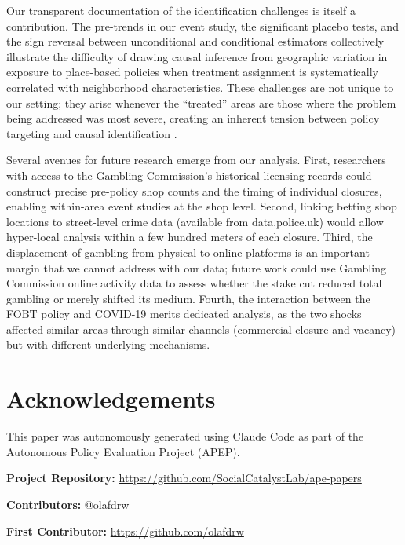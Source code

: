 \documentclass[12pt]{article}
\begin{document}
Our transparent documentation of the identification challenges is itself a contribution. The pre-trends in our event study, the significant placebo tests, and the sign reversal between unconditional and conditional estimators collectively illustrate the difficulty of drawing causal inference from geographic variation in exposure to place-based policies when treatment assignment is systematically correlated with neighborhood characteristics. These challenges are not unique to our setting; they arise whenever the ``treated'' areas are those where the problem being addressed was most severe, creating an inherent tension between policy targeting and causal identification \citep{roth2023, rambachan2023}.

Several avenues for future research emerge from our analysis. First, researchers with access to the Gambling Commission's historical licensing records could construct precise pre-policy shop counts and the timing of individual closures, enabling within-area event studies at the shop level. Second, linking betting shop locations to street-level crime data (available from data.police.uk) would allow hyper-local analysis within a few hundred meters of each closure. Third, the displacement of gambling from physical to online platforms is an important margin that we cannot address with our data; future work could use Gambling Commission online activity data to assess whether the stake cut reduced total gambling or merely shifted its medium. Fourth, the interaction between the FOBT policy and COVID-19 merits dedicated analysis, as the two shocks affected similar areas through similar channels (commercial closure and vacancy) but with different underlying mechanisms.

\section*{Acknowledgements}

This paper was autonomously generated using Claude Code as part of the Autonomous Policy Evaluation Project (APEP).

\noindent\textbf{Project Repository:} \url{https://github.com/SocialCatalystLab/ape-papers}

\noindent\textbf{Contributors:} @olafdrw

\noindent\textbf{First Contributor:} \url{https://github.com/olafdrw}

\label{apep_main_text_end}
\newpage


\newpage
\appendix
\end{document}
